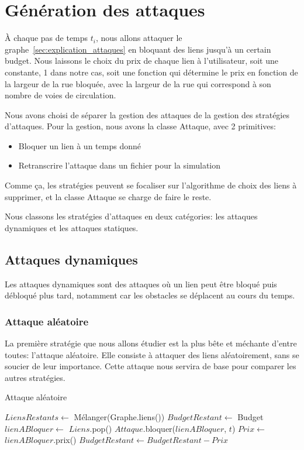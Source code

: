\section{Génération des attaques}\label{sec:attaques}

\`A chaque pas de temps ${t_{i}}$, nous allons attaquer le graphe~\ref{sec:explication_attaques} en bloquant des liens jusqu'à un certain budget.
Nous laissons le choix du prix de chaque lien à l'utilisateur, soit une constante, 1 dans notre cas, soit une fonction qui détermine le prix en fonction de la largeur de la rue bloquée,
avec la largeur de la rue qui correspond à son nombre de voies de circulation.

Nous avons choisi de séparer la gestion des attaques de la gestion des stratégies d'attaques.
Pour la gestion, nous avons la classe Attaque, avec 2 primitives:
\begin{itemize}
    \item Bloquer un lien à un temps donné
    \item Retranscrire l'attaque dans un fichier pour la simulation
\end{itemize}
Comme ça, les stratégies peuvent se focaliser sur l'algorithme de choix des liens à supprimer, et la classe Attaque se charge de faire le reste.

Nous classons les stratégies d'attaques en deux catégories: les attaques dynamiques et les attaques statiques.

\subsection{Attaques dynamiques}\label{subsec:attaques_dynamiques}

Les attaques dynamiques sont des attaques où un lien peut être bloqué puis débloqué plus tard, notamment car les obstacles se déplacent au cours du temps.

\subsubsection{Attaque aléatoire}\label{subsubsec:attaque_aleatoire}

La première stratégie que nous allons étudier est la plus bête et méchante d'entre toutes: l'attaque aléatoire.
Elle consiste à attaquer des liens aléatoirement, sans se soucier de leur importance.
Cette attaque nous servira de base pour comparer les autres stratégies.
\begin{algorithm}[H]
\caption{Attaque aléatoire}
\begin{algorithmic}
    \State $LiensRestants \gets$ Mélanger(Graphe.liens())
    \State $BudgetRestant \gets$ Budget
        \State $lienABloquer \gets$ $Liens$.pop()
        \State $Attaque$.bloquer($lienABloquer$, $t$)
        \State $Prix \gets$ $lienABloquer$.prix()
        \State $BudgetRestant \gets BudgetRestant - Prix$
    \EndWhile
\EndFor
\end{algorithmic}
\end{algorithm}

